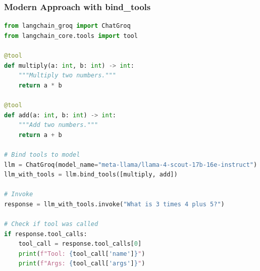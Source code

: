 









\begin{frame}[fragile]\frametitle{Modern Approach with bind\_tools}

\begin{lstlisting}[language=python, basicstyle=\tiny]
from langchain_groq import ChatGroq
from langchain_core.tools import tool

@tool
def multiply(a: int, b: int) -> int:
    """Multiply two numbers."""
    return a * b

@tool  
def add(a: int, b: int) -> int:
    """Add two numbers."""
    return a + b

# Bind tools to model
llm = ChatGroq(model_name="meta-llama/llama-4-scout-17b-16e-instruct")
llm_with_tools = llm.bind_tools([multiply, add])

# Invoke
response = llm_with_tools.invoke("What is 3 times 4 plus 5?")

# Check if tool was called
if response.tool_calls:
    tool_call = response.tool_calls[0]
    print(f"Tool: {tool_call['name']}")
    print(f"Args: {tool_call['args']}")
\end{lstlisting}

\end{frame}

